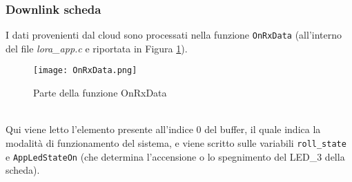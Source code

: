 \newpage
  \subsubsection{Downlink scheda}\label{sssec:downlink_scheda}
  I dati provenienti dal cloud sono processati nella funzione \Verb|OnRxData| (all'interno del file \textit{lora\_app.c} e riportata in Figura \ref{fig:onrxdata}).
  \begin{figure}[h!]
    \centering
    \texttt{[image: OnRxData.png]}
    \caption{Parte della funzione OnRxData}
    \label{fig:onrxdata}
  \end{figure}
  \\Qui viene letto l'elemento presente all'indice 0 del buffer, il quale indica la modalità di funzionamento del sistema, e viene scritto sulle variabili \Verb|roll_state| e \Verb|AppLedStateOn| (che determina l'accensione o lo spegnimento del LED\_3 della scheda).

